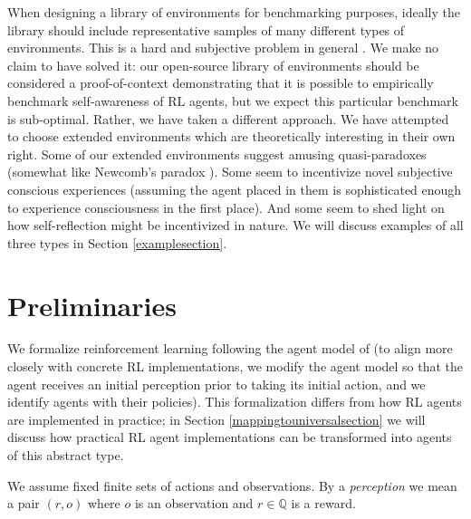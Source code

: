 \documentclass{article}
\begin{document}
When designing a library of environments for benchmarking purposes, ideally the
library should include representative samples of many different types of
environments. This is a hard and subjective problem in general
\cite{leike2015bad}. We make no claim to have solved
it: our open-source library of environments should be considered a proof-of-context
demonstrating that it is possible to empirically benchmark self-awareness of RL
agents, but we expect this particular benchmark is sub-optimal.
Rather, we have taken a different approach.
We have attempted to choose extended environments which are theoretically
interesting in their own right. Some of our extended environments
suggest amusing quasi-paradoxes (somewhat like Newcomb's paradox
\cite{nozick1969newcomb}). Some seem to incentivize novel subjective conscious
experiences (assuming the agent placed in them is sophisticated enough to experience
consciousness in the first place). And some seem to shed light on how self-reflection
might be incentivized in nature. We will discuss examples of all three types in
Section \ref{examplesection}.

\section{Preliminaries}

We formalize reinforcement learning following
the agent model of \cite{hutter2004universal}
(to align more closely with concrete RL implementations, we modify
the agent model so that the agent receives an initial perception prior
to taking its initial action, and we identify agents with their policies).
This formalization differs from how RL agents are
implemented in practice; in Section \ref{mappingtouniversalsection}
we will discuss how practical RL agent implementations can be
transformed into agents of this abstract type.

We assume fixed finite sets of actions and observations. By a \emph{perception}
we mean a pair $(r,o)$ where $o$ is an observation and $r\in\mathbb Q$
is a reward.
\end{document}
